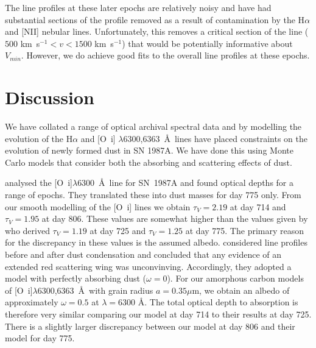 \documentclass[useAMS,usenatbib,usegraphicx]{mnras}
\begin{document}
The line profiles at these later epochs are relatively noisy and have had 
substantial sections of the profile removed as a result of contamination 
by the H$\alpha$ and [NII] nebular lines.  Unfortunately, this removes a 
critical section of the line ($500$ km~s$^{-1}<v<1500$ km~s$^{-1}$) that 
would be potentially informative about $V_{min}$.  However, we do achieve good fits 
to the  overall line profiles at these epochs.



\section{Discussion}
\label{discuss}

We have collated a range of optical archival spectral data and by modelling the evolution of the H$\alpha$ and 
[O~{\sc i}] $\lambda$6300,6363~\AA\ lines have placed constraints on the 
evolution of newly formed dust in SN 1987A. We have done this using Monte Carlo 
models that consider both the absorbing and scattering effects of dust.  


\citet{Lucy1989} analysed the [O~{\sc i}]$\lambda$6300~\AA\ line for SN~1987A and found optical depths for a range of epochs. They translated these into dust masses for day 775 only.  
From our smooth modelling of the [O~{\sc i}] lines we obtain $\tau_V=2.19$ at day 714 and $\tau_V=1.95$ at day 806.  These values are somewhat higher than the values given by \citet{Lucy1989} who derived $\tau_V=1.19$ at day 725 and $\tau_V=1.25$ at day 775.  The primary reason for the discrepancy in these values is the assumed albedo.  \citet{Lucy1989} considered line profiles before and after dust condensation and concluded that any evidence of an extended red scattering wing was unconvinving.  Accordingly, they adopted a model with perfectly absorbing dust ($\omega = 0$).  For our amorphous carbon models of [O~{\sc i}]$\lambda$6300,6363~\AA\ with grain radius $a=0.35\mu$m, we obtain an albedo of approximately $\omega = 0.5$ at $\lambda=6300$ \AA.  The total optical depth to absorption is therefore very similar comparing our model at day 714 to their results at day  725.  There is a slightly larger discrepancy between our model at day 806 and their model for day 775.  
\end{document}
